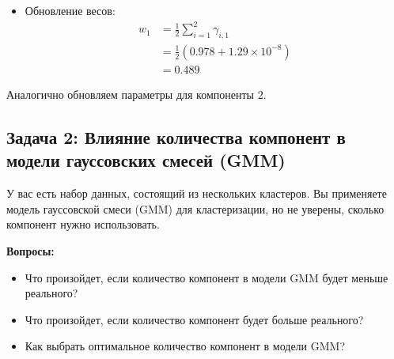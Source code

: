 \begin{itemize}
\begin{itemize}
              \item Обновление весов:
                    \begin{align*}
                        w_1 & = \frac{1}{2} \sum_{i=1}^{2} \gamma_{i,1}   \\
                            & = \frac{1}{2} (0.978 + 1.29 \times 10^{-8}) \\
                            & = 0.489
                    \end{align*}
          \end{itemize}

          Аналогично обновляем параметры для компоненты 2.
\end{itemize}

\subsection{Задача 2: Влияние количества компонент в модели гауссовских смесей (GMM)}

У вас есть набор данных, состоящий из нескольких кластеров. Вы применяете модель гауссовской смеси (GMM) для кластеризации, но не уверены, сколько компонент нужно использовать.

\noindent\textbf{Вопросы:}
\begin{itemize}
    \item Что произойдет, если количество компонент в модели GMM будет меньше реального?
    \item Что произойдет, если количество компонент будет больше реального?
    \item Как выбрать оптимальное количество компонент в модели GMM?
\end{itemize}

